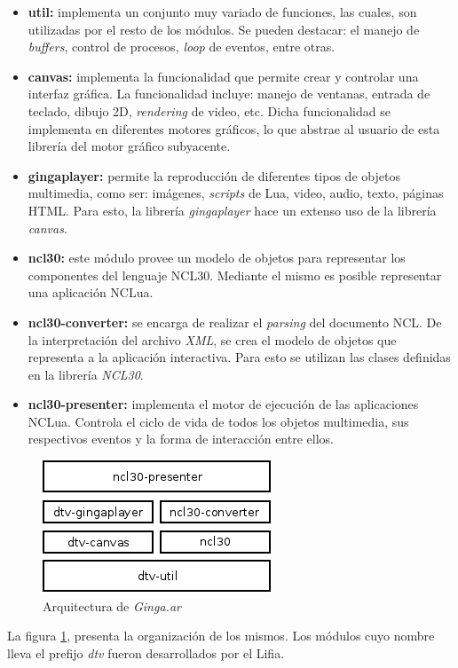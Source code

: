 \begin{itemize}
\item \textbf{util:}
implementa un conjunto muy variado de funciones, las cuales, son utilizadas por el resto de los módulos. 
Se pueden destacar: el manejo de \textit{buffers}, control de procesos, \textit{loop} de eventos, entre otras.

\item \textbf{canvas:}
implementa la funcionalidad que permite crear y controlar una interfaz gráfica. La funcionalidad incluye: manejo 
de ventanas, entrada de teclado, dibujo 2D, \textit{rendering} de video, etc. Dicha funcionalidad se implementa en diferentes
motores gráficos, lo que abstrae al usuario de esta librería del motor gráfico subyacente.

\item \textbf{gingaplayer:}
permite la reproducción de diferentes tipos de objetos multimedia, como ser: imágenes, 
\textit{scripts} de Lua, video, audio, texto, páginas HTML. Para esto, la librería \emph{gingaplayer} hace un extenso uso de la librería 
\emph{canvas}.

\item \textbf{ncl30:}
este módulo provee un modelo de objetos para representar los componentes del lenguaje NCL30. Mediante el mismo es posible representar
una aplicación NCLua.
 
\item \textbf{ncl30-converter:} 
se encarga de realizar el \textit{parsing} del documento NCL. De la interpretación del archivo \textit{XML}, se 
crea el modelo de objetos que representa a la aplicación interactiva. Para esto se 
utilizan las clases definidas en la librería \textit{NCL30}.

\item \textbf{ncl30-presenter:} 
implementa el motor de ejecución de las aplicaciones NCLua. Controla el ciclo de vida de todos los objetos multimedia, 
sus respectivos eventos y la forma de interacción entre ellos.
\end{itemize}


\begin{figure}[ht!]
\centering
\includegraphics[scale=0.60]{../resources/ginga-modules.png}
\caption{Arquitectura de \emph{Ginga.ar}}
\label{ginga:modules}
\end{figure}
La figura \ref{ginga:modules}, presenta la organización de los mismos.
Los módulos cuyo nombre lleva el prefijo \textit{dtv} fueron desarrollados por el Lifia.\\

